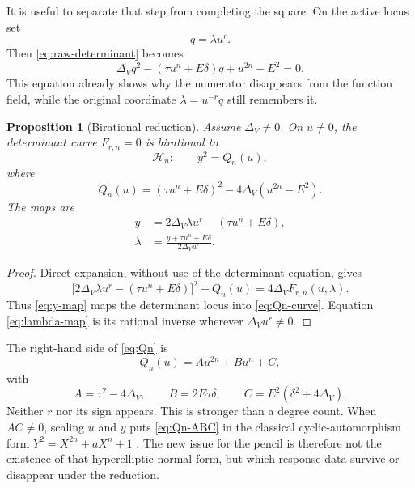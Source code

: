 \documentclass[11pt,reqno]{amsart}
\newtheorem{proposition}[theorem]{Proposition}
\theoremstyle{remark}
\newcommand{\cH}{\mathcal H}
\begin{document}
It is useful to separate that step from completing the square.  On the active
locus set
\begin{equation}\label{eq:q-coordinate}
 q=\lambda u^r.
\end{equation}
Then \eqref{eq:raw-determinant} becomes
\begin{equation}\label{eq:q-conic}
 \Delta_Vq^2-(\tau u^n+E\delta)q+u^{2n}-E^2=0.
\end{equation}
This equation already shows why the numerator disappears from the function
field, while the original coordinate $\lambda=u^{-r}q$ still remembers it.

\begin{proposition}[Birational reduction]\label{prop:birational-reduction}
Assume $\Delta_V\ne0$.  On $u\ne0$, the determinant curve
$F_{r,n}=0$ is birational to
\begin{equation}\label{eq:Qn-curve}
 \cH_n:\qquad y^2=Q_n(u),
\end{equation}
where
\begin{equation}\label{eq:Qn}
 Q_n(u)=(\tau u^n+E\delta)^2
        -4\Delta_V(u^{2n}-E^2).
\end{equation}
The maps are
\begin{align}
 y&=2\Delta_V\lambda u^r-(\tau u^n+E\delta),
 \label{eq:y-map}\\
 \lambda&=
 \frac{y+\tau u^n+E\delta}{2\Delta_Vu^r}.
 \label{eq:lambda-map}
\end{align}
\end{proposition}

\begin{proof}
Direct expansion, without use of the determinant equation, gives
\begin{equation}\label{eq:birational-identity}
 \bigl[2\Delta_V\lambda u^r-(\tau u^n+E\delta)\bigr]^2
 -Q_n(u)=4\Delta_VF_{r,n}(u,\lambda).
\end{equation}
Thus \eqref{eq:y-map} maps the determinant locus into \eqref{eq:Qn-curve}.
Equation \eqref{eq:lambda-map} is its rational inverse wherever
$\Delta_Vu^r\ne0$.
\end{proof}

The right-hand side of \eqref{eq:Qn} is
\begin{equation}\label{eq:Qn-ABC}
 Q_n(u)=Au^{2n}+Bu^n+C,
\end{equation}
with
\begin{equation}\label{eq:ABC}
 A=\tau^2-4\Delta_V,\qquad
 B=2E\tau\delta,\qquad
 C=E^2(\delta^2+4\Delta_V).
\end{equation}
Neither $r$ nor its sign appears.  This is stronger than a degree count.
When $AC\ne0$, scaling $u$ and $y$ puts \eqref{eq:Qn-ABC} in the classical
cyclic-automorphism form $Y^2=X^{2n}+aX^n+1$ \cite{Shaska2003}.  The new issue
for the pencil is therefore not the existence of that hyperelliptic normal
form, but which response data survive or disappear under the reduction.
\end{document}
